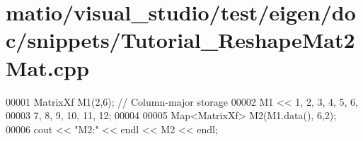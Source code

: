 \hypertarget{matio_2visual__studio_2test_2eigen_2doc_2snippets_2_tutorial___reshape_mat2_mat_8cpp_source}{}\section{matio/visual\+\_\+studio/test/eigen/doc/snippets/\+Tutorial\+\_\+\+Reshape\+Mat2\+Mat.cpp}
\label{matio_2visual__studio_2test_2eigen_2doc_2snippets_2_tutorial___reshape_mat2_mat_8cpp_source}

\begin{DoxyCode}
00001 MatrixXf M1(2,6);    \textcolor{comment}{// Column-major storage}
00002 M1 << 1, 2, 3,  4,  5,  6,
00003       7, 8, 9, 10, 11, 12;
00004 
00005 Map<MatrixXf> M2(M1.data(), 6,2);
00006 cout << \textcolor{stringliteral}{"M2:"} << endl << M2 << endl;
\end{DoxyCode}
